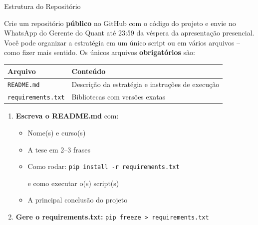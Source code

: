 \documentclass[11pt,a4paper]{article}
\newcommand{\code}[1]{%
  \colorbox{quantlightgray}{\texttt{\small\color{quantdark}#1}}%
}
\begin{document}
\begin{stepbox}{Estrutura do Reposit\'orio}

Crie um reposit\'orio \textbf{p\'ublico} no GitHub com o c\'odigo do projeto e envie no WhatsApp do Gerente do Quant até 23:59 da véspera da apresentação presencial.
Voc\^e pode organizar a estrat\'egia em um \'unico script ou em v\'arios
arquivos -- como fizer mais sentido. Os \'unicos arquivos
\textbf{obrigat\'orios} s\~ao:

\vspace{0.6em}
\begin{tabularx}{\textwidth}{@{}lX@{}}
  \toprule
  \textcolor{quantpurple}{\textbf{Arquivo}} &
  \textcolor{quantpurple}{\textbf{Conte\'udo}} \\
  \midrule
  \code{README.md}        & Descri\c{c}\~ao da estrat\'egia e instru\c{c}\~oes de execu\c{c}\~ao \\[3pt]
  \code{requirements.txt} & Bibliotecas com vers\~oes exatas \\
  \bottomrule
\end{tabularx}

\vspace{0.8em}

\begin{enumerate}
  \item \textbf{Escreva o README.md} com:
        \begin{itemize}
          \item Nome(s) e curso(s)
          \item A tese em 2--3 frases
          \item Como rodar: \code{pip install -r requirements.txt}
                e como executar o(s) script(s)
          \item A principal conclus\~ao do projeto
        \end{itemize}

  \item \textbf{Gere o requirements.txt:}\quad
        \code{pip freeze > requirements.txt}
\end{enumerate}
\end{stepbox}

\vfill
\end{document}
